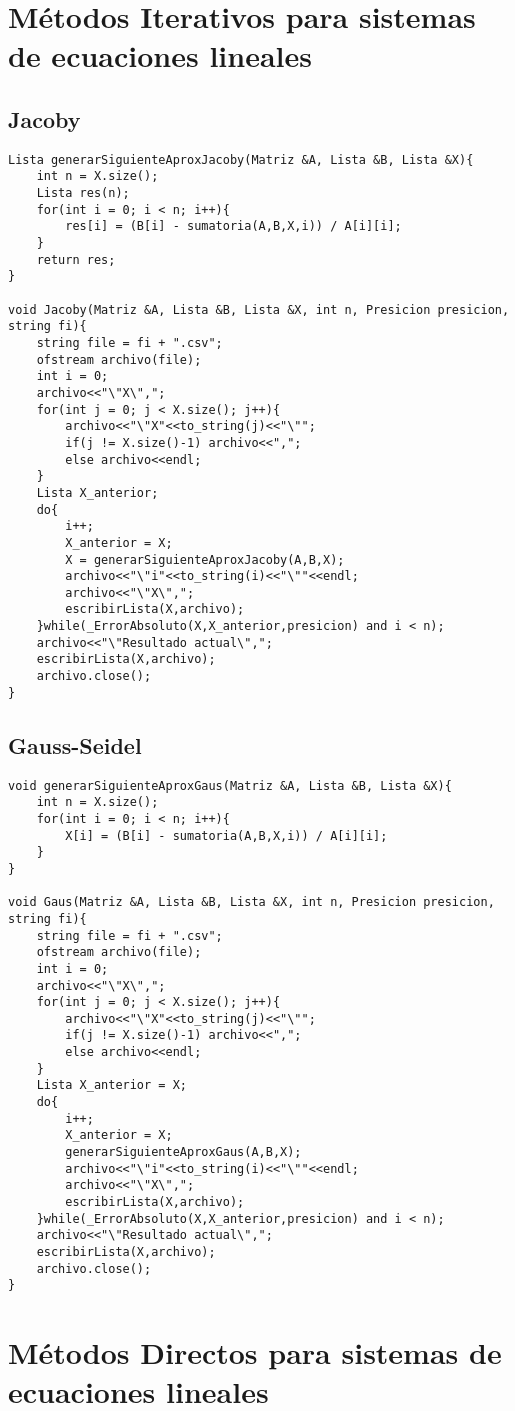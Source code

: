 \documentclass[a4paper,12pt]{article}
\begin{document}
\section{Métodos Iterativos para sistemas de ecuaciones lineales}
  \subsection{Jacoby}
  \begin{lstlisting}
Lista generarSiguienteAproxJacoby(Matriz &A, Lista &B, Lista &X){
	int n = X.size();
	Lista res(n);
	for(int i = 0; i < n; i++){
		res[i] = (B[i] - sumatoria(A,B,X,i)) / A[i][i];
	}
	return res;
}

void Jacoby(Matriz &A, Lista &B, Lista &X, int n, Presicion presicion, string fi){
	string file = fi + ".csv";
	ofstream archivo(file);
	int i = 0;
	archivo<<"\"X\",";
	for(int j = 0; j < X.size(); j++){
		archivo<<"\"X"<<to_string(j)<<"\"";
		if(j != X.size()-1) archivo<<",";
		else archivo<<endl;
	}
	Lista X_anterior;
	do{
		i++;
		X_anterior = X;
		X = generarSiguienteAproxJacoby(A,B,X);
		archivo<<"\"i"<<to_string(i)<<"\""<<endl;
		archivo<<"\"X\",";
		escribirLista(X,archivo);
	}while(_ErrorAbsoluto(X,X_anterior,presicion) and i < n);
	archivo<<"\"Resultado actual\",";
	escribirLista(X,archivo);
	archivo.close();
}
  \end{lstlisting}
  \subsection{Gauss-Seidel}
  \begin{lstlisting}
void generarSiguienteAproxGaus(Matriz &A, Lista &B, Lista &X){
	int n = X.size();
	for(int i = 0; i < n; i++){
		X[i] = (B[i] - sumatoria(A,B,X,i)) / A[i][i];
	}
}

void Gaus(Matriz &A, Lista &B, Lista &X, int n, Presicion presicion, string fi){
	string file = fi + ".csv";
	ofstream archivo(file);
	int i = 0;
	archivo<<"\"X\",";
	for(int j = 0; j < X.size(); j++){
		archivo<<"\"X"<<to_string(j)<<"\"";
		if(j != X.size()-1) archivo<<",";
		else archivo<<endl;
	}
	Lista X_anterior = X;
	do{
		i++;
		X_anterior = X;
		generarSiguienteAproxGaus(A,B,X);
		archivo<<"\"i"<<to_string(i)<<"\""<<endl;
		archivo<<"\"X\",";
		escribirLista(X,archivo);
	}while(_ErrorAbsoluto(X,X_anterior,presicion) and i < n);
	archivo<<"\"Resultado actual\",";
	escribirLista(X,archivo);
	archivo.close();
}
  \end{lstlisting}

\section{Métodos Directos para sistemas de ecuaciones lineales}
\end{document}
